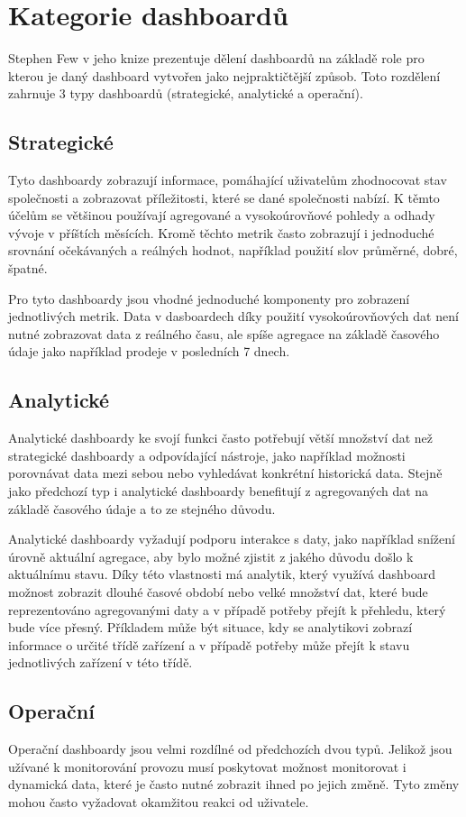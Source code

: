 \section{Kategorie dashboardů}
Stephen Few v jeho knize \cite{few2013information} prezentuje dělení dashboardů na základě role pro kterou je daný dashboard vytvořen jako nejpraktičtější způsob. Toto rozdělení zahrnuje 3 typy dashboardů (strategické, analytické a operační).

\subsection{Strategické}
Tyto dashboardy zobrazují informace, pomáhající uživatelům zhodnocovat stav společnosti a zobrazovat příležitosti, které se dané společnosti nabízí. K těmto účelům se většinou používají agregované a vysokoúrovňové pohledy a odhady vývoje v příštích měsících. Kromě těchto metrik často zobrazují i jednoduché srovnání očekávaných a reálných hodnot, například použití slov průměrné, dobré, špatné.

Pro tyto dashboardy jsou vhodné jednoduché komponenty pro zobrazení jednotlivých metrik. Data v dasboardech díky použití vysokoúrovňových dat není nutné zobrazovat data z reálného času, ale spíše agregace na základě časového údaje jako například prodeje v posledních 7 dnech.

\subsection{Analytické}
Analytické dashboardy ke svojí funkci často potřebují větší množství dat než strategické dashboardy a odpovídající nástroje, jako například možnosti porovnávat data mezi sebou nebo vyhledávat konkrétní historická data. Stejně jako předchozí typ i analytické dashboardy benefitují z agregovaných dat na základě časového údaje a to ze stejného důvodu. 

Analytické dashboardy vyžadují podporu interakce s daty, jako například snížení úrovně aktuální agregace, aby bylo možné zjistit z jakého důvodu došlo k aktuálnímu stavu. Díky této vlastnosti má analytik, který využívá dashboard možnost zobrazit dlouhé časové období nebo velké množství dat, které bude reprezentováno agregovanými daty a v případě potřeby přejít k přehledu, který bude více přesný. Příkladem může být situace, kdy se analytikovi zobrazí informace o určité třídě zařízení a v případě potřeby může přejít k stavu jednotlivých zařízení v této třídě.

\subsection{Operační}
Operační dashboardy jsou velmi rozdílné od předchozích dvou typů. Jelikož jsou užívané k monitorování provozu musí poskytovat možnost monitorovat i dynamická data, které je často nutné zobrazit ihned po jejich změně. Tyto změny mohou často vyžadovat okamžitou reakci od uživatele. 

